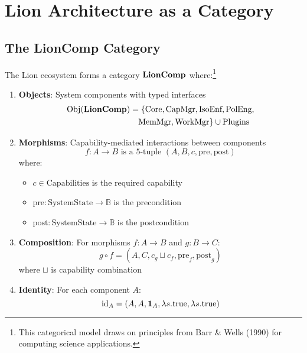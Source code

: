\section{Lion Architecture as a Category}

\subsection{The LionComp Category}

\begin{definition}
The Lion ecosystem forms a category $\mathbf{LionComp}$ where:\footnote{This categorical model draws on principles from Barr \& Wells (1990) for computing science applications.}
\begin{enumerate}
\item \textbf{Objects}: System components with typed interfaces
\begin{align}
\mathrm{Obj}(\mathbf{LionComp}) &= \{\text{Core}, \text{CapMgr}, \text{IsoEnf}, \text{PolEng}, \nonumber \\
&\quad \text{MemMgr}, \text{WorkMgr}\} \cup \text{Plugins}
\end{align}

\item \textbf{Morphisms}: Capability-mediated interactions between components
\begin{equation}
f: A \to B \text{ is a 5-tuple } (A, B, c, \text{pre}, \text{post})
\end{equation}
where:
\begin{itemize}
\item $c \in \text{Capabilities}$ is the required capability
\item $\text{pre}: \text{SystemState} \to \mathbb{B}$ is the precondition
\item $\text{post}: \text{SystemState} \to \mathbb{B}$ is the postcondition
\end{itemize}

\item \textbf{Composition}: For morphisms $f: A \to B$ and $g: B \to C$:
\begin{equation}
g \circ f = (A, C, c_g \sqcup c_f, \text{pre}_f, \text{post}_g)
\end{equation}
where $\sqcup$ is capability combination

\item \textbf{Identity}: For each component $A$:
\begin{equation}
\mathrm{id}_A = (A, A, \mathbf{1}_A, \lambda s.\text{true}, \lambda s.\text{true})
\end{equation}
\end{enumerate}
\end{definition}

